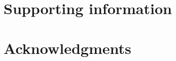 \documentclass[10pt,letterpaper]{article}
\begin{document}
\section*{Supporting information}

\section*{Acknowledgments}


\nolinenumbers



%
%
% 


\end{document}
